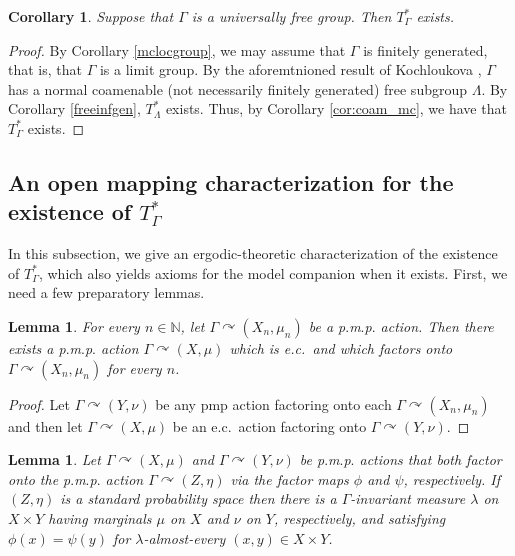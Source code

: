 \documentclass[12pt]{amsart}
\newtheorem{lem}[thm]{Lemma}
\newtheorem{cor}[thm]{Corollary}
\theoremstyle{definition}
\newcommand\bN{{\mathbb N}}
\newcommand{\pmp}{p{$.$}m{$.$}p{$.$}}
\newcommand{\acts}{\curvearrowright}
\begin{document}
\begin{cor}
Suppose that $\Gamma$ is a universally free group.  Then $T_\Gamma^*$ exists.
\end{cor}

\begin{proof}
By Corollary \ref{mclocgroup}, we may assume that $\Gamma$ is finitely generated, that is, that $\Gamma$ is a limit group.  By the aforemtnioned result of Kochloukova \cite{Kochloukova}, $\Gamma$ has a normal coamenable (not necessarily finitely generated) free subgroup $\Lambda$.  By Corollary \ref{freeinfgen}, $T_\Lambda^*$ exists.  Thus, by Corollary \ref{cor:coam_mc}, we have that $T_\Gamma^*$ exists.
\end{proof}

\subsection{An open mapping characterization for the existence of \texorpdfstring{$T_\Gamma^*$}{the model companion}}\label{openmappingsub}

In this subsection, we give an ergodic-theoretic characterization of the existence of $T_\Gamma^*$, which also yields axioms for the model companion when it exists.  First, we need a few preparatory lemmas.

\begin{lem}\label{eccover}
	For every $n \in \bN$, let $\Gamma \acts (X_n, \mu_n)$ be a {\pmp} action. Then there exists a {\pmp} action $\Gamma \acts (X, \mu)$ which is e.c.\ and which factors onto $\Gamma \acts (X_n, \mu_n)$ for every $n$.
\end{lem}

\begin{proof}
	Let $\Gamma\acts (Y,\nu)$ be any pmp action factoring onto each $\Gamma\acts (X_n,\mu_n)$ and then let $\Gamma\acts (X,\mu)$ be an e.c.\ action factoring onto $\Gamma \acts (Y,\nu)$.
\end{proof}

\begin{lem} \label{lem:amalgam}
	Let $\Gamma \acts (X, \mu)$ and $\Gamma \acts (Y, \nu)$ be {\pmp} actions that both factor onto the {\pmp} action $\Gamma \acts (Z, \eta)$ via the factor maps $\phi$ and $\psi$, respectively. If $(Z, \eta)$ is a standard probability space then there is a $\Gamma$-invariant measure $\lambda$ on $X \times Y$ having marginals $\mu$ on $X$ and $\nu$ on $Y$, respectively, and satisfying $\phi(x) = \psi(y)$ for $\lambda$-almost-every $(x, y) \in X \times Y$.
\end{lem}
\end{document}
